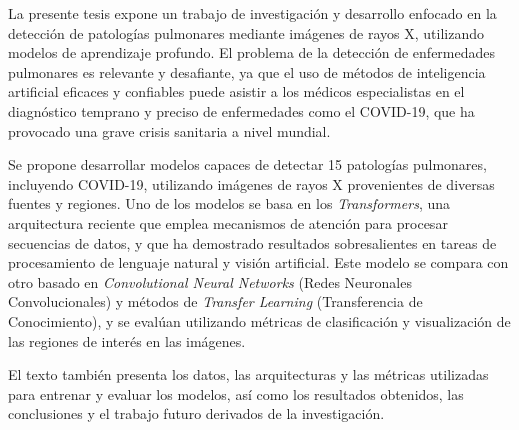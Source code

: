 

La presente tesis expone un trabajo de investigación y desarrollo enfocado en la detección de
patologías pulmonares mediante imágenes de rayos X, utilizando modelos de aprendizaje profundo. El
problema de la detección de enfermedades pulmonares es relevante y desafiante, ya que el uso de
métodos de inteligencia artificial eficaces y confiables puede asistir a los médicos especialistas
en el diagnóstico temprano y preciso de enfermedades como el COVID-19, que ha provocado una grave
crisis sanitaria a nivel mundial.

Se propone desarrollar modelos capaces de detectar 15 patologías pulmonares, incluyendo
COVID-19, utilizando imágenes de rayos X provenientes de diversas fuentes y regiones. Uno de los
modelos se basa en los \textit{Transformers}, una arquitectura reciente que emplea mecanismos de
atención para procesar secuencias de datos, y que ha demostrado resultados sobresalientes en tareas
de procesamiento de lenguaje natural y visión artificial. Este modelo se compara con otro basado en
\textit{Convolutional Neural Networks} (Redes Neuronales Convolucionales) y métodos de
\textit{Transfer Learning} (Transferencia de Conocimiento), y se evalúan utilizando métricas de
clasificación y visualización de las regiones de interés en las imágenes.

El texto también presenta los datos, las arquitecturas y las métricas utilizadas para entrenar y
evaluar los modelos, así como los resultados obtenidos, las conclusiones y el trabajo futuro
derivados de la investigación.
